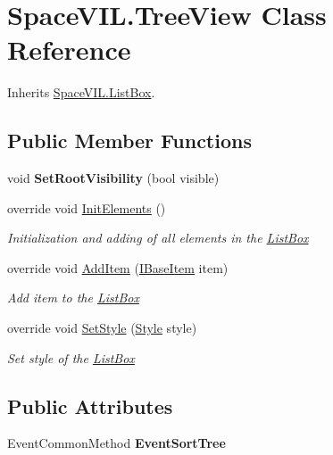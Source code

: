 \hypertarget{class_space_v_i_l_1_1_tree_view}{}\section{Space\+V\+I\+L.\+Tree\+View Class Reference}
\label{class_space_v_i_l_1_1_tree_view}


Inherits \mbox{\hyperlink{class_space_v_i_l_1_1_list_box}{Space\+V\+I\+L.\+List\+Box}}.

\subsection*{Public Member Functions}
\begin{DoxyCompactItemize}
\item 
\mbox{\label{class_space_v_i_l_1_1_tree_view_a68f63833eaa2ae522b123247df082c8b}} 
void {\bfseries Set\+Root\+Visibility} (bool visible)
\item 
override void \mbox{\hyperlink{class_space_v_i_l_1_1_tree_view_ac44a1df7d58a35e35842170162645e08}{Init\+Elements}} ()
\begin{DoxyCompactList}\small\item\em Initialization and adding of all elements in the \mbox{\hyperlink{class_space_v_i_l_1_1_list_box}{List\+Box}} \end{DoxyCompactList}\item 
override void \mbox{\hyperlink{class_space_v_i_l_1_1_tree_view_ab810906945c91dc1db571b446ea2f6a0}{Add\+Item}} (\mbox{\hyperlink{interface_space_v_i_l_1_1_core_1_1_i_base_item}{I\+Base\+Item}} item)
\begin{DoxyCompactList}\small\item\em Add item to the \mbox{\hyperlink{class_space_v_i_l_1_1_list_box}{List\+Box}} \end{DoxyCompactList}\item 
override void \mbox{\hyperlink{class_space_v_i_l_1_1_tree_view_aac5935163cddb3e34bcef8ee112ae1dd}{Set\+Style}} (\mbox{\hyperlink{class_space_v_i_l_1_1_decorations_1_1_style}{Style}} style)
\begin{DoxyCompactList}\small\item\em Set style of the \mbox{\hyperlink{class_space_v_i_l_1_1_list_box}{List\+Box}} \end{DoxyCompactList}\end{DoxyCompactItemize}
\subsection*{Public Attributes}
\begin{DoxyCompactItemize}
\item 
\mbox{\label{class_space_v_i_l_1_1_tree_view_a1e348b398ac5e1d7cd1dd52b91f5eae7}} 
Event\+Common\+Method {\bfseries Event\+Sort\+Tree}
\end{DoxyCompactItemize}
